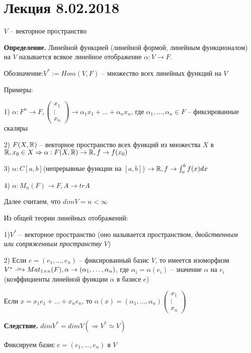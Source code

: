 \section{Лекция 8.02.2018}

$V$ -- векторное пространство

\textbf{Определение.} Линейной функцией (линейной формой, линейным функционалом) на $V$ называется всякое линейное отображение $\alpha : V \rightarrow F$.

Обозначение:$V^{*} := Hom(V, F)$ -- множество всех линейных функций на $V$

\bigskip
Примеры:

1) $\alpha : F^n \rightarrow F, \begin{pmatrix} x_1 \\ \vdots \\ x_n \end{pmatrix} \rightarrow \alpha_1 x_1 + \dots + \alpha_n x_n$, где $\alpha_1, \dots, \alpha_n \in F$ -- фиксированные скаляры

2) $F(X, \mathbb{R})$ -- векторное пространство всех функций из множества $X$ в $\mathbb{R}, x_0 \in X \Rightarrow \alpha : F(X, \mathbb{R}) \rightarrow \mathbb{R}, f \rightarrow f(x_0)$

3) $\alpha : C[a, b]$(непрерывные функции на $[a, b]$) $\rightarrow \mathbb{R}, f \rightarrow \int^b_a f(x) dx$ 

4) $\alpha: M_n(F) \rightarrow F, A \rightarrow trA$

\bigskip
Далее считаем, что $dimV = n < \infty$

Из общей теории линейных отображений:

1)$V^{*}$ -- векторное пространство (оно называется пространством, \textit{двойственным или сопряженным пространству} $V$)

2) Если $e = (e_1, \dots, e_n)$ -- фиксированный базис $V$, то имеется изоморфизм $V^{*} \iso Mat_{1 \times n}(F), \alpha \rightarrow (\alpha_1, \dots, \alpha_n)$, где $\alpha_i = \alpha(e_i)$ -- значение $\alpha$ на $e_i$ (коэффициенты линейной функции $\alpha$ в базисе $e$)

Если $x = x_1 e_1 + \dots + x_n e_n$, то $\alpha(x) = (\alpha_1, \dots, \alpha_n) \begin{pmatrix} x_1 \\ \vdots \\ x_n \end{pmatrix}$

\textbf{Следствие.} $dimV^* = dimV (\Rightarrow V^{*} \simeq V)$

\bigskip
Фиксируем базис $e = (e_1, \dots, e_n)$ в $V$

